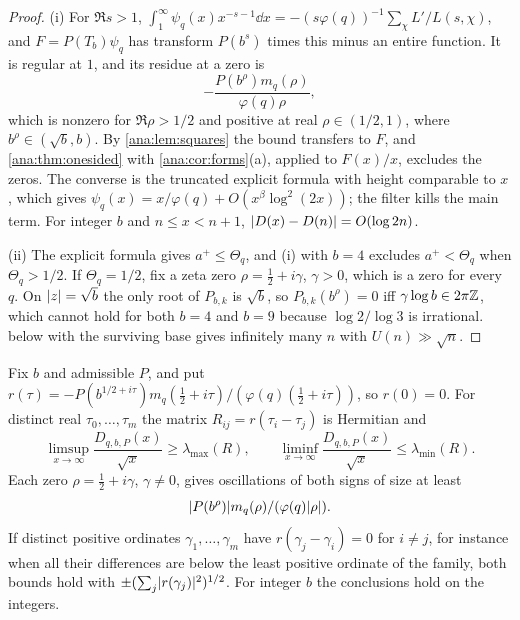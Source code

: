 \begin{proof}
(i) For $\Re s>1$,
$\int_1^\infty\psi_q(x)x^{-s-1}\dd x=-(s\varphi(q))^{-1}\sum_\chi L'/L(s,\chi)$, and
$F=P(T_b)\psi_q$ has transform $P(b^s)$ times this minus an entire function. It is regular
at $1$, and its residue at a zero is
\[
 -\frac{P(b^\rho)m_q(\rho)}{\varphi(q)\rho},
\]
which is nonzero for
$\Re\rho>1/2$ and positive at real $\rho\in(1/2,1)$, where $b^\rho\in(\sqrt b,b)$. By
\cref{ana:lem:squares} the bound transfers to $F$, and \cref{ana:thm:onesided} with
\cref{ana:cor:forms}(a), applied to $F(x)/x$, excludes the zeros. The converse is the
truncated explicit formula \cite{Davenport2000Multiplicative} with height comparable to $x$,
which gives $\psi_q(x)=x/\varphi(q)+O(x^\beta\log^2(2x))$; the filter kills the main term. For
integer $b$ and $n\le x<n+1$, $\lvert D(x)-D(n)\rvert=O(\log2n)$.

(ii) The explicit formula gives $a^+\le\Theta_q$, and (i) with $b=4$ excludes $a^+<\Theta_q$
when $\Theta_q>1/2$. If $\Theta_q=1/2$, fix a zeta zero $\rho=\frac12+i\gamma$, $\gamma>0$,
which is a zero for every $q$. On $\lvert z\rvert=\sqrt b$ the only root of $P_{b,k}$ is $\sqrt b$,
so $P_{b,k}(b^\rho)=0$ iff $\gamma\log b\in2\pi\mathbb{Z}$, which cannot hold for both $b=4$ and $b=9$
because $\log2/\log3$ is irrational.  below with the surviving base
gives infinitely many $n$ with $U(n)\gg\sqrt n$.
\end{proof}

\begin{theorem}\label{ana:thm:oscillation}
Fix $b$ and admissible $P$, and put
$r(\tau)=-P(b^{1/2+i\tau})m_q(\frac12+i\tau)/(\varphi(q)(\frac12+i\tau))$, so $r(0)=0$. For
distinct real $\tau_0,\dots,\tau_m$ the matrix $R_{ij}=r(\tau_i-\tau_j)$ is Hermitian and
\[
 \limsup_{x\to\infty}\frac{D_{q,b,P}(x)}{\sqrt x}\ge\lambda_{\max}(R),\qquad
 \liminf_{x\to\infty}\frac{D_{q,b,P}(x)}{\sqrt x}\le\lambda_{\min}(R).
\]
Each zero $\rho=\frac12+i\gamma$, $\gamma\ne0$, gives oscillations of both signs of size at
least
\[
 \lvert P(b^\rho)\rvert m_q(\rho)/(\varphi(q)\lvert\rho\rvert).
\]
If distinct positive ordinates
$\gamma_1,\dots,\gamma_m$ have $r(\gamma_j-\gamma_i)=0$ for $i\ne j$, for instance when all their
differences are below the least positive ordinate of the family, both bounds hold with
$\pm(\sum_j\lvert r(\gamma_j)\rvert^2)^{1/2}$. For integer $b$ the conclusions hold on the integers.
\end{theorem}

